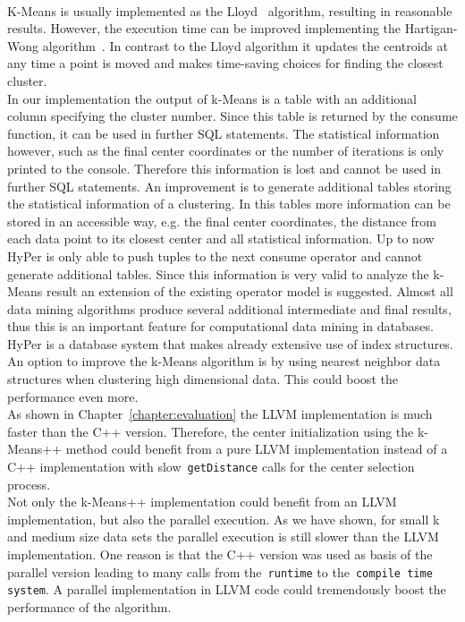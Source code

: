 \\
K-Means is usually implemented as the Lloyd~\parencite{Lloyd82} algorithm, resulting in reasonable results. However, the execution time can be improved implementing the Hartigan-Wong algorithm~\parencite{hartigan1979algorithm}. In contrast to the Lloyd algorithm it updates the centroids at any time a point is moved and makes time-saving choices for finding the closest cluster.
\\
In our implementation the output of k-Means is a table with an additional column specifying the cluster number. Since this table is returned by the consume function, it can be used in further SQL statements. The statistical information however, such as the final center coordinates or the number of iterations is only printed to the console. Therefore this information is lost and cannot be used in further SQL statements. An improvement is to generate additional tables storing the statistical information of a clustering. In this tables more information can be stored in an accessible way, e.g. the final center coordinates, the distance from each data point to its closest center and all statistical information. Up to now HyPer is only able to push tuples to the next consume operator and cannot generate additional tables. Since this information is very valid to analyze the k-Means result an extension of the existing operator model is suggested. Almost all data mining algorithms produce several additional intermediate and final results, thus this is an important feature for computational data mining in databases.
\\
HyPer is a database system that makes already extensive use of index structures. An option to improve the k-Means algorithm is by using nearest neighbor data structures when clustering high dimensional data. This could boost the performance even more.
\\
As shown in Chapter~\ref{chapter:evaluation} the LLVM implementation is much faster than the C++ version. Therefore, the center initialization using the k-Means++ method could benefit from a pure LLVM implementation instead of a C++ implementation with slow~\texttt{getDistance} calls for the center selection process.
\\
Not only the k-Means++ implementation could benefit from an LLVM implementation, but also the parallel execution. As we have shown, for small k and medium size data sets the parallel execution is still slower than the LLVM implementation. One reason is that the C++ version was used as basis of the parallel version leading to many calls from the~\texttt{runtime} to the~\texttt{compile time system}. A parallel implementation in LLVM code could tremendously boost the performance of the algorithm. 
